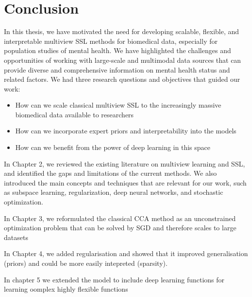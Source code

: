 \chapter{Conclusion}

In this thesis, we have motivated the need for developing scalable, flexible, and interpretable multiview SSL methods for biomedical data, especially for population studies of mental health. We have highlighted the challenges and opportunities of working with large-scale and multimodal data sources that can provide diverse and comprehensive information on mental health status and related factors. We had three research questions and objectives that guided our work:

\begin{itemize} 
\item How can we scale classical multiview SSL to the increasingly massive biomedical data available to researchers 
\item How can we incorporate expert priors and interpretability into the models
\item How  can we benefit from the power of deep learning in this space
\end{itemize}

In Chapter 2, we reviewed the existing literature on multiview learning and SSL, and identified the gaps and limitations of the current methods. We also introduced the main concepts and techniques that are relevant for our work, such as subspace learning, regularization, deep neural networks, and stochastic optimization.

In Chapter 3, we reformulated the classical CCA method as an unconstrained optimization problem that can be solved by SGD and therefore scales to large datasets

In Chapter 4, we added regularisation and showed that it improved generalisation (priors) and could be more easily intepreted (sparsity).

In chapter 5 we extended the model to include deep learning functions for learning oomplex highly flexible  functions

